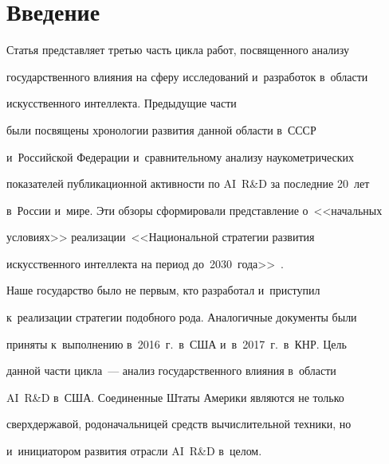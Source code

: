 




    \thispagestyle{headings}





    \vspace*{-12pt}





   \section{Введение}





  Статья представляет третью часть цик\-ла работ, посвященного анализу


государственного влияния на сферу исследований и~разработок в~об\-ласти


искусственного интеллекта. Предыдущие части~\cite{1-bor, 2-bor}


были посвящены хронологии развития данной области в~СССР


и~Российской Федерации и~сравнительному анализу наукометрических


показателей публикационной активности по AI~R\&D за последние 20~лет


в~России и~мире. Эти обзоры сформировали пред\-став\-ле\-ние о~<<начальных


условиях>> реализации~<<Национальной стратегии развития


искусственного интеллекта на период до~2030~года>>~\cite{3-bor}.





  Наше государство было не первым, кто разработал и~приступил


к~реализации стратегии подобного рода. Аналогичные документы были


приняты к~выполнению в~2016~г.\ в~США и~в~2017~г.\ в~КНР. Цель


данной части цикла~--- анализ государственного влияния в~об\-ласти


AI~R\&D в~США. Соединенные Штаты Америки являются не только


сверхдержавой, родоначальницей средств вычислительной техники, но


и~инициатором развития отрасли AI~R\&D в~целом.





